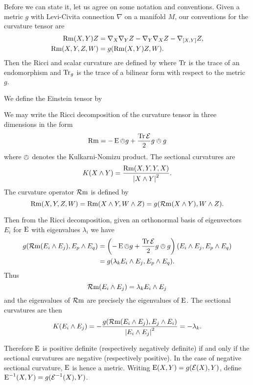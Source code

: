 \documentclass[a4paper,12pt]{amsart}
\begin{document}
Before we can state it, let us agree on some notation and conventions. Given a metric \(g\) with Levi-Civita connection $\nabla$ on a manifold $M$, our conventions for the curvature tensor are
\[
\begin{split}
\operatorname{Rm}(X, Y) Z &= \nabla_X \nabla_Y Z - \nabla_Y \nabla_X Z - \nabla_{[X, Y]} Z, \\
\operatorname{Rm}(X, Y, Z, W) &= g(\operatorname{Rm}(X, Y) Z, W).
\end{split}
\]
Then the Ricci and scalar curvature are defined by
where $\operatorname{Tr}$ is the trace of an endomorphism and $\operatorname{Tr}_{g}$ is the trace of a bilinear form with respect to the metric $g$.

We define the Einstein tensor by

We may write the Ricci decomposition of the curvature tensor in three dimensions in the form
\begin{equation}
\label{eq:ricci_decomp}
\operatorname{Rm} = -\operatorname{E} \owedge g + \frac{\operatorname{Tr} \operatorname{\mathcal{E}}}{2} g \owedge g
\end{equation}
where \(\owedge\) denotes the Kulkarni-Nomizu product. The sectional curvatures are
\[
K(X \wedge Y) = \frac{\operatorname{Rm}(X, Y, Y, X)}{\left\lvert{X \wedge Y}\right\rvert^2}.
\]
The curvature operator \(\operatorname{\mathcal{R}m}\) is defined by
\[
\operatorname{Rm}(X, Y, Z, W) = \operatorname{Rm}(X \wedge Y, W \wedge Z) = g(\operatorname{\mathcal{R}m}(X \wedge Y), W \wedge Z).
\]

Then from the Ricci decomposition, given an orthonormal basis of eigenvectors \(E_i\) for \(\operatorname{E}\) with eigenvalues \(\lambda_i\) we have
\[
\begin{split}
g(\operatorname{\mathcal{R}m}(E_i \wedge E_j), E_p \wedge E_q) &= \left(-\operatorname{E} \owedge g + \frac{\operatorname{Tr} \operatorname{\mathcal{E}}}{2} g \owedge g\right) (E_i \wedge E_j, E_p \wedge E_q) \\
&= g(\lambda_k E_i \wedge E_j, E_p \wedge E_q).
\end{split}
\]
Thus
\[
\operatorname{\mathcal{R}m}(E_i \wedge E_j) = \lambda_k E_i \wedge E_j
\]
and the eigenvalues of \(\operatorname{\mathcal{R}m}\) are precisely the eigenvalues of \(\operatorname{E}\). The sectional curvatures are then
\begin{equation}
\label{eq:sectional}
K (E_i \wedge E_j) = -\frac{g(\operatorname{\mathcal{R}m}(E_i \wedge E_j), E_j \wedge E_i)}{\left\lvert{E_i \wedge E_j}\right\rvert^2} = -\lambda_k.
\end{equation}

Therefore \(\operatorname{E}\) is positive definite (respectively negatively definite) if and only if the sectional curvatures are negative (respectively positive). In the case of negative sectional curvature, \(\operatorname{E}\) is hence a metric. Writing \(\operatorname{E}(X, Y) = g(\operatorname{\mathcal{E}}(X), Y)\), define \(\operatorname{E}^{-1}(X, Y) = g(\operatorname{\mathcal{E}}^{-1} (X), Y)\).
\end{document}
